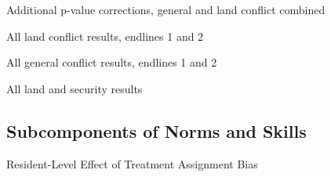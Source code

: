 \documentclass[10pt]{article}
\begin{document}
\begin{table}[H]
\caption{Additional p-value corrections, general and land conflict combined}
\label{conflict_adj_p_year}
\begin{center}
\begin{adjustbox}{max width = \textwidth}

\end{adjustbox}
\end{center}
\end{table}


\begin{table}[H]
\caption{All land conflict results, endlines 1 and 2}
\begin{center}
\begin{adjustbox}{max width = \textwidth}

\end{adjustbox}
\end{center}
\end{table}

\begin{table}[H]
\caption{All general conflict results, endlines 1 and 2}
\begin{center}
\begin{adjustbox}{max width = \textwidth}

\end{adjustbox}
\end{center}
\end{table}

\begin{table}[H]
\caption{All land and security results}
\begin{center}
\begin{adjustbox}{max width = \textwidth}

\end{adjustbox}
\end{center}
\end{table}



\subsection{Subcomponents of Norms and Skills}

\begin{table}[H]
\caption{Resident-Level Effect of Treatment Assignment Bias}
\begin{center}
\begin{adjustbox}{max width = \textwidth}

\end{adjustbox}
\end{center}
\end{table}
\end{document}

